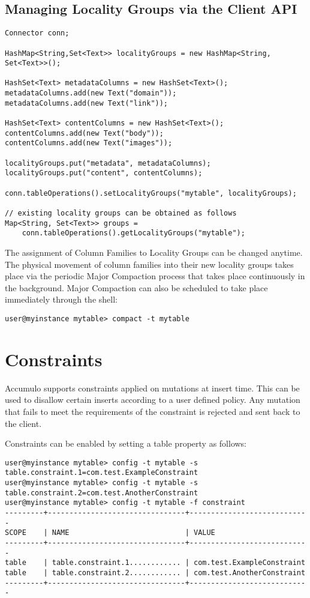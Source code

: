 \subsection{Managing Locality Groups via the Client API}

\small
\begin{verbatim}
Connector conn;

HashMap<String,Set<Text>> localityGroups = new HashMap<String, Set<Text>>();

HashSet<Text> metadataColumns = new HashSet<Text>();
metadataColumns.add(new Text("domain"));
metadataColumns.add(new Text("link"));

HashSet<Text> contentColumns = new HashSet<Text>();
contentColumns.add(new Text("body"));
contentColumns.add(new Text("images"));

localityGroups.put("metadata", metadataColumns);
localityGroups.put("content", contentColumns);

conn.tableOperations().setLocalityGroups("mytable", localityGroups);

// existing locality groups can be obtained as follows
Map<String, Set<Text>> groups =
    conn.tableOperations().getLocalityGroups("mytable");
\end{verbatim}
\normalsize

The assignment of Column Families to Locality Groups can be changed anytime. The
physical movement of column families into their new locality groups takes place via
the periodic Major Compaction process that takes place continuously in the
background. Major Compaction can also be scheduled to take place immediately
through the shell:

\small
\begin{verbatim}
user@myinstance mytable> compact -t mytable
\end{verbatim}
\normalsize

\section{Constraints}

Accumulo supports constraints applied on mutations at insert time. This can be
used to disallow certain inserts according to a user defined policy. Any mutation
that fails to meet the requirements of the constraint is rejected and sent back to the
client.

Constraints can be enabled by setting a table property as follows:

\small
\begin{verbatim}
user@myinstance mytable> config -t mytable -s table.constraint.1=com.test.ExampleConstraint
user@myinstance mytable> config -t mytable -s table.constraint.2=com.test.AnotherConstraint
user@myinstance mytable> config -t mytable -f constraint
---------+--------------------------------+----------------------------
SCOPE    | NAME                           | VALUE
---------+--------------------------------+----------------------------
table    | table.constraint.1............ | com.test.ExampleConstraint
table    | table.constraint.2............ | com.test.AnotherConstraint
---------+--------------------------------+----------------------------
\end{verbatim}
\normalsize

